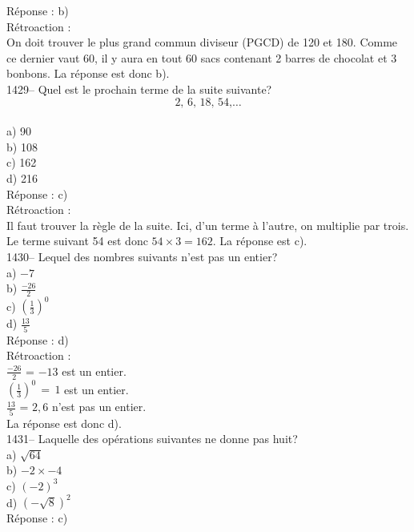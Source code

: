 R\'eponse : b)\\

R\'etroaction :\\
On doit trouver le plus grand commun diviseur (PGCD) de 120 et 180.
Comme ce dernier vaut 60, il y aura en tout 60 sacs contenant 2
barres de chocolat et 3 bonbons. La r\'eponse est donc b).\\

1429-- Quel est le prochain terme de la suite suivante?
$${\textrm{2, 6, 18, 54,}}
\ldots$$\\
a) 90\\
b) 108\\
c) 162\\
d) 216\\

R\'eponse : c)\\

R\'etroaction :\\
Il faut trouver la r\`egle de la suite. Ici, d'un terme \`a l'autre,
on multiplie par trois. Le terme suivant 54 est donc
$54\times3=162$. La r\'eponse est c).\\

1430-- Lequel des nombres suivants n'est pas un entier?\\
a) $-7$\\[3mm]
b) $\frac{-26}{2}$\\[3mm]
c) $\left(\frac{1}{3}\right)^0$\\[3mm]
d) $\frac{13}{5}$\\

R\'eponse : d)\\

R\'etroaction :\\
$\frac{-26}{2}$ = $-13$ est un entier.\\[3mm]
$\left(\frac{1}{3}\right)^0\,=\,1$ est un entier.\\[3mm]
$\frac{13}{5}$ = $2,6$ n'est pas un entier.\\[3mm]
La r\'eponse est donc d).\\

1431-- Laquelle des op\'erations suivantes ne donne pas huit?\\
a) $\sqrt{64}$\\
b) $-2\times-4$\\
c) $(-2)^3$\\
d) $(-\sqrt8)^2$\\

R\'eponse : c)\\

